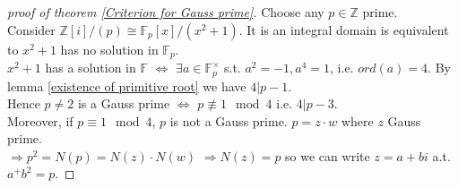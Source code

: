 \begin{proof}[proof of theorem \ref{Criterion for Gauss prime}]
    Choose any  $ p\in \mathbb{Z} $ prime. \\
    Consider  $ \mathbb{Z}[i]/(p)\cong \mathbb{F}_p[x]/(x^2+1) $. It is an integral domain is equivalent to  $ x^2+1  $ has no solution in  $ \mathbb{F}_p $.\\
     $ x^2+1  $ has a solution in  $ \mathbb{F} $ $ \Leftrightarrow $  $ \exists a\in \mathbb{F}_p^\times  $ s.t.  $ a^2=-1,a^4=1 $, i.e.  $ ord(a)=4 $. By lemma \ref{existence of primitive root} we have  $ 4|p-1 $.\\
     Hence  $ p\not=2  $ is a Gauss prime  $ \Leftrightarrow $  $ p\not\equiv 1\mod 4 $ i.e.  $ 4|p-3 $.\\
     Moreover, if  $ p\equiv 1\mod 4 $,  $ p   $ is not a Gauss prime.  $ p=z\cdot w $ where  $ z  $ Gauss prime.\\
      $ \Rightarrow p^2=N(p)=N(z)\cdot N(w) $  $ \Rightarrow N(z)=p $ so we can write  $ z=a+bi  $ a.t.  $ a^+b^2=p $.             
\end{proof}